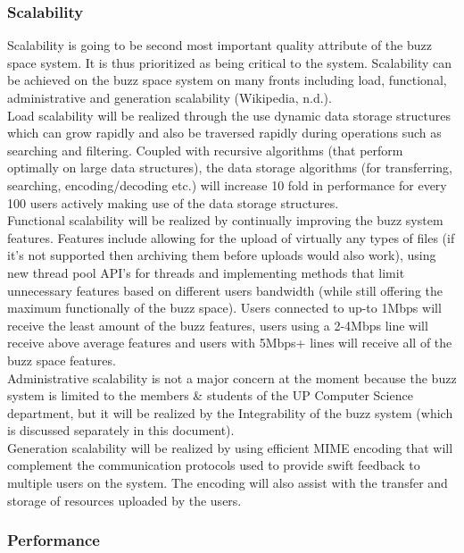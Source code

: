 \subsubsection{Scalability}
Scalability is going to be second most important quality attribute of the buzz space system. It is thus prioritized as being critical to the system. Scalability can be achieved on the buzz space system on many fronts including load, functional, administrative and generation scalability (Wikipedia, n.d.).\\

Load scalability will be realized through the use dynamic data storage structures which can grow rapidly and also be traversed rapidly during operations such as searching and filtering. Coupled with recursive algorithms (that perform optimally on large data structures), the data storage algorithms (for transferring, searching, encoding/decoding etc.) will increase 10 fold in performance for every 100 users actively making use of the data storage structures.\\

Functional scalability will be realized by continually improving the buzz system features. Features include allowing for the upload of virtually any types of files (if it’s not supported then archiving them before uploads would also work), using new thread pool API’s for threads and implementing methods that limit unnecessary features based on different users bandwidth (while still offering the maximum functionally of the buzz space). Users connected to up-to 1Mbps will receive the least amount of the buzz features, users using a 2-4Mbps line will receive above average features and users with 5Mbps+ lines will receive all of the buzz space features.\\

Administrative scalability is not a major concern at the moment because the buzz system is limited to the members \& students of the UP Computer Science department, but it will be realized by the Integrability of the buzz system (which is discussed separately in this document).\\

Generation scalability will be realized by using efficient MIME encoding that will complement the communication protocols used to provide swift feedback to multiple users on the system. The encoding will also assist with the transfer and storage of resources uploaded by the users. \\

\subsubsection{Performance}

